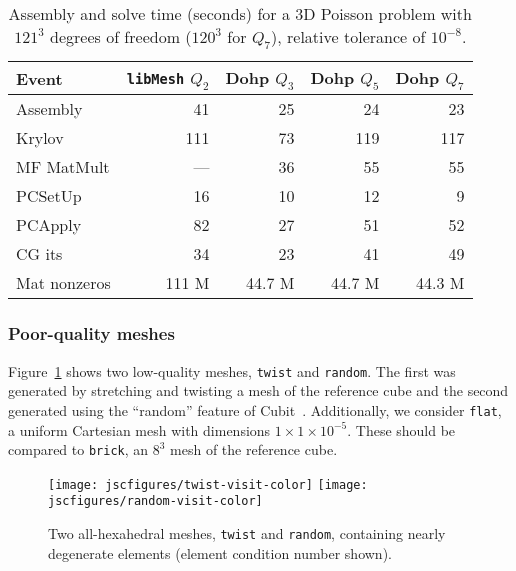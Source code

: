 \begin{table}
  \centering
  \begin{tabular}{l rrrr}
    \toprule
    Event        & \texttt{libMesh} $Q_2$ & Dohp $Q_3$ & Dohp $Q_5$ & Dohp $Q_7$ \\
    \midrule
    Assembly     & 41            & 25         & 24         & 23         \\
    Krylov       & 111           & 73         & 119        & 117        \\
    MF MatMult   & ---           & 36         & 55         & 55         \\
    PCSetUp      & 16            & 10         & 12         & 9          \\
    PCApply      & 82            & 27         & 51         & 52         \\
    \midrule
    CG its       & 34            & 23         & 41         & 49         \\
    Mat nonzeros & 111 M         & 44.7 M     & 44.7 M     & 44.3 M     \\
    \bottomrule
  \end{tabular}
  \caption{Assembly and solve time (seconds) for a 3D Poisson problem with $121^3$ degrees of freedom ($120^3$ for
    $Q_7$), relative tolerance of $10^{-8}$.}\label{tab:libmesh}
\end{table}

\subsubsection{Poor-quality meshes}
Figure~\ref{fig:quality} shows two low-quality meshes, \texttt{twist} and \texttt{random}.  The first was generated by
stretching and twisting a mesh of the reference cube and the second generated using the ``random'' feature of
Cubit~\citep{blacker1994cmg}.  Additionally, we consider \texttt{flat}, a uniform Cartesian mesh with dimensions $1\times
1 \times 10^{-5}$.  These should be compared to \texttt{brick}, an $8^3$ mesh of the reference cube.

\begin{figure}
  \centering
  \texttt{[image: jscfigures/twist-visit-color]}
  \texttt{[image: jscfigures/random-visit-color]}
  \caption{Two all-hexahedral meshes, \texttt{twist} and \texttt{random}, containing nearly degenerate elements (element condition number shown).}
  \label{fig:quality}
\end{figure}

